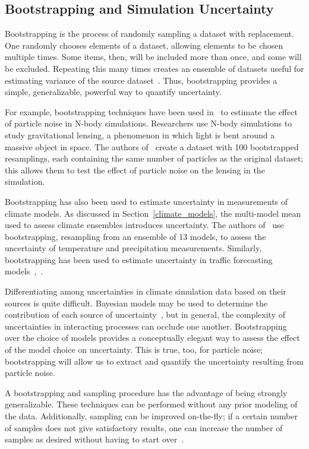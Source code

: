 \subsection{Bootstrapping and Simulation Uncertainty}
\label{bootstrapping}
Bootstrapping is the process of randomly sampling a dataset with replacement. One randomly chooses elements of a dataset, allowing elements to be chosen multiple times. Some items, then, will be included more than once, and some will be excluded. Repeating this many times creates an ensemble of datasets useful for estimating variance of the source dataset~\cite{Steck}. Thus, bootstrapping provides a simple, generalizable, powerful way to quantify uncertainty. 

For example, bootstrapping techniques have been used  in~\cite{rau} to estimate the effect of particle noise in N-body simulations. Researchers use N-body simulations to study gravitational lensing, a phenomenon in which light is bent around a massive object in space. The authors of~\cite{rau} create a dataset with 100 bootstrapped resamplings, each containing the same number of particles as the original dataset; this allows them to test the effect of particle noise on the lensing in the simulation.

Bootstrapping has also been used to estimate uncertainty in measurements of climate models. As discussed in Section~\ref{climate_models}, the multi-model mean used to assess climate ensembles introduces uncertainty. The authors of~\cite{vavrus} use bootstrapping, resampling from an ensemble of 13  models, to assess the uncertainty of temperature and precipitation measurements. Similarly, bootstrapping has been used to estimate uncertainty in traffic forecasting models~\cite{RePEc:eee:transa:v:39:y:2005:i:6:p:531-547},~\cite{Brundell2000}.

Differentiating among uncertainties in climate simulation data based on their sources is quite difficult. Bayesian models may be used to determine the contribution of each source of uncertainty~\cite{northrop}, but in general, the complexity of uncertainties in interacting processes can occlude one another. Bootstrapping over the choice of models provides a conceptually elegant way to assess the effect of the model choice on uncertainty. This is true, too, for particle noise; bootstrapping will allow us to extract and quantify the uncertainty resulting from particle noise. 

A bootstrapping and sampling procedure has the advantage of being strongly generalizable. These techniques can be performed without any prior modeling of the data. Additionally, sampling can be improved on-the-fly; if a certain number of samples does not give satisfactory results, one can increase the number of samples as desired without having to start over~\cite{Cormode:2012:SMD:2344400.2344401}.

